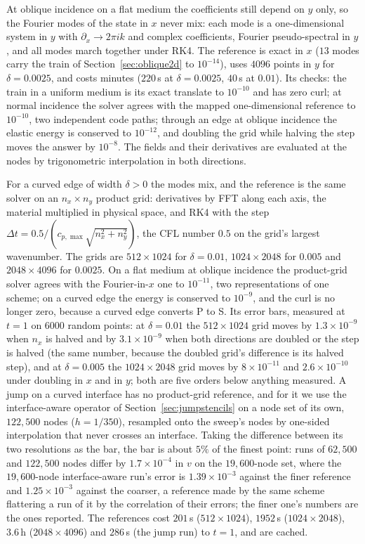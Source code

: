 \documentclass[11pt]{amsart}
\theoremstyle{definition}
\theoremstyle{remark}
\newcommand{\px}{\partial_x}
\begin{document}
At oblique incidence on a flat medium the coefficients still depend on
$y$ only, so the Fourier modes of the state in $x$ never mix: each mode
is a one-dimensional system in $y$ with $\px \to 2\pi i k$ and complex
coefficients, Fourier pseudo-spectral in $y$, and all modes march
together under RK4. The reference is exact in $x$ ($13$ modes carry the
train of Section~\ref{sec:oblique2d} to $10^{-14}$), uses $4096$ points
in $y$ for $\delta = 0.0025$, and costs minutes ($220$\,s at
$\delta = 0.0025$, $40$\,s at $0.01$). Its checks: the train in a
uniform medium is its exact translate to $10^{-10}$ and has zero curl;
at normal incidence the solver agrees with the mapped one-dimensional
reference to $10^{-10}$, two independent code paths; through an edge at
oblique incidence the elastic energy is conserved to $10^{-12}$, and
doubling the grid while halving the step moves the answer by $10^{-8}$.
The fields and their derivatives are evaluated at the nodes by
trigonometric interpolation in both directions.

For a curved edge of width $\delta > 0$ the modes mix, and the reference
is the same solver on an $n_x \times n_y$ product grid: derivatives by
FFT along each axis, the material multiplied in physical space, and
RK4 with the step $\Delta t = 0.5 / (c_{p,\max} \sqrt{n_x^2 + n_y^2})$,
the CFL number $0.5$ on the grid's largest wavenumber. The grids are
$512 \times 1024$ for $\delta = 0.01$, $1024 \times 2048$ for $0.005$ and
$2048 \times 4096$ for $0.0025$. On a flat medium at oblique incidence
the product-grid solver agrees with the Fourier-in-$x$ one to
$10^{-11}$, two representations of one scheme; on a curved edge the
energy is conserved to $10^{-9}$, and the curl is no longer zero,
because a curved edge converts P to S. Its error bars, measured at $t = 1$
on $6000$ random points: at $\delta = 0.01$ the $512 \times 1024$ grid
moves by $1.3 \times 10^{-9}$ when $n_x$ is halved and by
$3.1 \times 10^{-9}$ when both directions are doubled or the step is
halved (the same number, because the doubled grid's difference is its
halved step), and at $\delta = 0.005$ the $1024 \times 2048$ grid moves by
$8 \times 10^{-11}$ and $2.6 \times 10^{-10}$ under doubling in $x$ and in
$y$; both are five orders below anything measured. A jump on a curved
interface has no product-grid reference, and for it we use the
interface-aware operator of Section~\ref{sec:jumpstencils} on a node set
of its own, $122{,}500$ nodes ($h = 1 / 350$), resampled onto the
sweep's nodes by one-sided interpolation that never crosses an
interface. Taking the difference between its two resolutions as the bar, the bar is
about $5\%$ of the finest point: runs of $62{,}500$ and $122{,}500$ nodes differ by
$1.7 \times 10^{-4}$ in $v$ on the $19{,}600$-node set, where the
$19{,}600$-node interface-aware run's error is $1.39 \times 10^{-3}$
against the finer reference and $1.25 \times 10^{-3}$ against the
coarser, a reference made by the same scheme flattering a run of it by
the correlation of their errors; the finer one's numbers are the ones
reported. The references cost $201$\,s ($512 \times 1024$), $1952$\,s
($1024 \times 2048$), $3.6$\,h ($2048 \times 4096$) and $286$\,s (the
jump run) to $t = 1$, and are cached.
\end{document}
